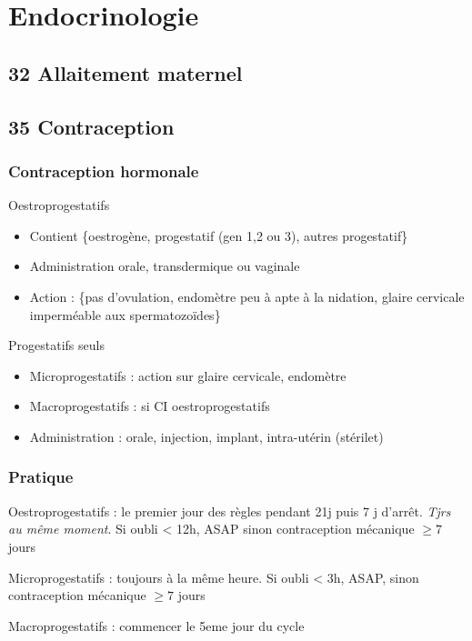 \documentclass[11pt]{article}
\begin{document}
\section{Endocrinologie}
\label{sec:orgf338972}
\subsection{32 \textdagger{} Allaitement maternel}
\label{sec:orgb06bfc1}
\subsection{35 \textdagger{} Contraception}
\label{sec:orgfc74c33}
\subsubsection{Contraception hormonale}
\label{sec:org653ff8f}
Oestroprogestatifs
\begin{itemize}
\item Contient \{oestrogène, progestatif (gen 1,2 ou 3), autres progestatif\}
\item Administration orale, transdermique ou vaginale
\item Action : \{pas d'ovulation, endomètre peu à apte à la nidation, glaire
cervicale imperméable aux spermatozoïdes\}
\end{itemize}
Progestatifs seuls 
\begin{itemize}
\item Microprogestatifs : action sur glaire cervicale, endomètre
\item Macroprogestatifs : si CI oestroprogestatifs
\item Administration : orale, injection, implant, intra-utérin (stérilet)
\end{itemize}
\subsubsection{Pratique}
\label{sec:org342fd6b}
Oestroprogestatifs : le premier jour des règles pendant 21j puis 7 j
d'arrêt. \emph{Tjrs au même moment}. Si oubli < 12h, ASAP sinon contraception mécanique \(\ge 7\) jours

Microprogestatifs : toujours à la même heure. Si oubli < 3h, ASAP, sinon
contraception mécanique \(\ge 7\) jours

Macroprogestatifs : commencer le 5eme jour du cycle
\end{document}

